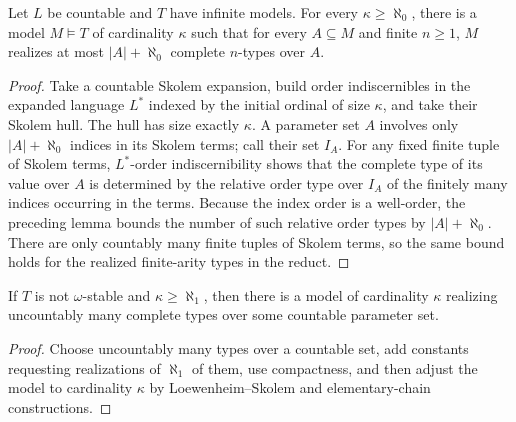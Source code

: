\begin{theorem}
\label{thm:few-types-model}
Let \(L\) be countable and \(T\) have infinite models.  For every
\(\kappa\geq\aleph_0\), there is a model \(M\models T\) of cardinality
\(\kappa\) such that for every \(A\subseteq M\) and finite \(n\geq1\),
\(M\) realizes at most \(|A|+\aleph_0\) complete \(n\)-types over \(A\).
\end{theorem}

\begin{proof}
Take a countable Skolem expansion, build order indiscernibles in the
expanded language \(L^*\) indexed by the initial ordinal of size
\(\kappa\), and take their Skolem hull.  The hull has size exactly
\(\kappa\).  A parameter set \(A\) involves only \(|A|+\aleph_0\)
indices in its Skolem terms; call their set \(I_A\).  For any fixed
finite tuple of Skolem terms, \(L^*\)-order indiscernibility shows that
the complete type of its value over \(A\) is determined by the relative
order type over \(I_A\) of the finitely many indices occurring in the
terms.  Because the index order is a well-order, the preceding lemma
bounds the number of such relative order types by \(|A|+\aleph_0\).
There are only countably many finite tuples of Skolem terms, so the same
bound holds for the realized finite-arity types in the reduct.
\end{proof}

\begin{lemma}
\label{lem:non-omega-stable-large-model-realizing-many-types}
If \(T\) is not \(\omega\)-stable and \(\kappa\geq\aleph_1\), then
there is a model of cardinality \(\kappa\) realizing uncountably many
complete types over some countable parameter set.
\end{lemma}

\begin{proof}
Choose uncountably many types over a countable set, add constants
requesting realizations of \(\aleph_1\) of them, use compactness, and
then adjust the model to cardinality \(\kappa\) by Loewenheim--Skolem
and elementary-chain constructions.
\end{proof}

